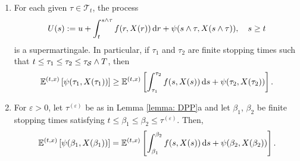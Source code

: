 \begin{corollary}
\label{cor: Corollary 10.5 in ØS}
    \begin{enumerate}[label=(\alph*)]
        \item For each given $\tau \in \mathcal{T}_t$, the process 
        \begin{equation*}
            U(s) := u + \int_t^{s \wedge \tau} f(r, X(r)) \,\mathrm{d} r + \psi(s \wedge \tau,X(s \wedge \tau)), \quad s \geq t
        \end{equation*}
        is a supermartingale. In particular, if $\tau_1$ and $\tau_2$ are finite stopping times such that $t \leq \tau_1 \leq \tau_2 \leq \tau_{\mathcal{S}} \wedge T$, then
        \begin{equation*}
            \mathbb{E}^{(t,x)} \left[ \psi(\tau_1, X(\tau_1)) \right] \geq \mathbb{E}^{(t,x)}\left[ \int_{\tau_1}^{\tau_2} f(s,X(s)) \,\mathrm{d} s + \psi(\tau_2, X(\tau_2)) \right].
        \end{equation*}
        \item For $\varepsilon>0$, let $\tau^{(\varepsilon)}$ be as in Lemma \ref{lemma: DPP}a and let $\beta_1$, $\beta_2$ be finite stopping times satisfying $t \leq \beta_1 \leq \beta_2 \leq \tau^{(\varepsilon)}$. Then,
        \begin{equation*}
            \mathbb{E}^{(t,x)}\left[ \psi(\beta_1, X(\beta_1)) \right] = \mathbb{E}^{(t,x)} \left[ \int_{\beta_1}^{\beta_2} f(s,X(s)) \,\mathrm{d} s + \psi(\beta_2,X(\beta_2))\right].
        \end{equation*}
    \end{enumerate}
\end{corollary}
